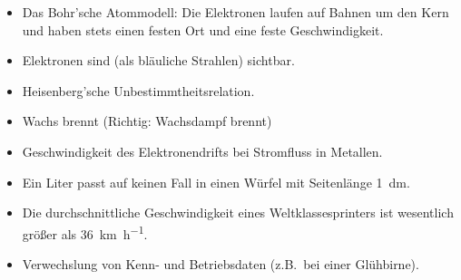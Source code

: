\begin{itemize}
\item
Das Bohr'sche Atommodell: Die Elektronen laufen auf Bahnen um den Kern und haben stets einen festen Ort
und eine feste Geschwindigkeit.
\item
Elektronen sind (als bl\"{a}uliche Strahlen) sichtbar.
\item
Heisenberg'sche Unbestimmtheitsrelation.
\end{itemize}

\begin{itemize}
\item
Wachs brennt (Richtig: Wachsdampf brennt)
\end{itemize}

\begin{itemize}
\item
Geschwindigkeit des Elektronendrifts bei Stromfluss in Metallen.
\item
Ein Liter passt auf keinen Fall in einen W\"{u}rfel mit Seitenl\"{a}nge
\SI{1}{\deci\meter}.
\item
Die durchschnittliche Geschwindigkeit eines Weltklassesprinters
ist wesentlich gr\"{o}{\ss}er als \SI{36}{\kilo\meter\per\hour}.
\end{itemize}

\begin{itemize}
\item
Verwechslung von Kenn- und Betriebsdaten (z.B.\ bei einer Gl\"{u}hbirne).
\end{itemize}



